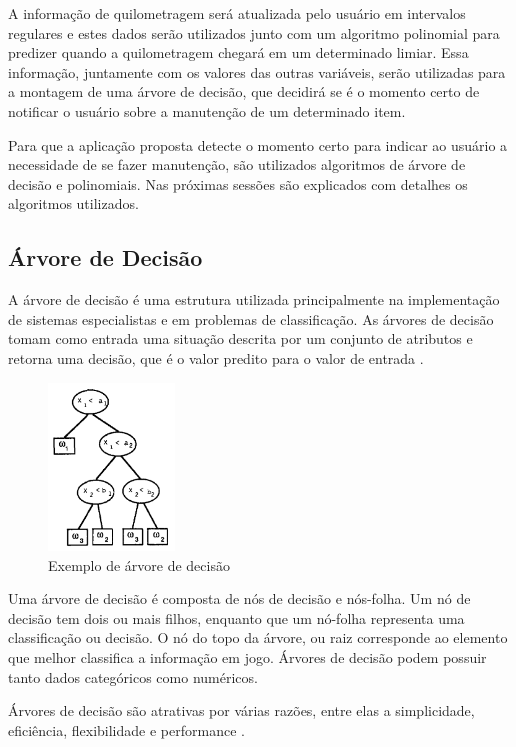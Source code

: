 \documentclass[12pt]{article}
\begin{document}
A informação de quilometragem será atualizada pelo usuário em intervalos
regulares e estes dados serão utilizados junto com um algoritmo polinomial
para predizer quando a quilometragem chegará em um determinado limiar. Essa
informação, juntamente com os valores das outras variáveis, serão utilizadas
para a montagem de uma árvore de decisão, que decidirá se é o momento certo de
notificar o usuário sobre a manutenção de um determinado item.

Para que a aplicação proposta detecte o momento certo para indicar ao usuário a
necessidade de se fazer manutenção, são utilizados algoritmos de árvore de
decisão e polinomiais. Nas próximas sessões são explicados com detalhes os
algoritmos utilizados.

\subsection{Árvore de Decisão}\label{sec:arvorededecisao}
A árvore de decisão é uma estrutura utilizada principalmente na implementação de
sistemas especialistas e em problemas de classificação. As árvores de decisão
tomam como entrada uma situação descrita por um conjunto de atributos e retorna
uma decisão, que é o valor predito para o valor de entrada \cite{russell2003}.

\begin{figure}[h]
\centering
\includegraphics[width=0.3\textwidth]{arvorededecisao}
\caption{Exemplo de árvore de decisão \cite{safavian1991survey}}
\label{arvorededecisao}
\end{figure}

Uma árvore de decisão é composta de nós de decisão e nós-folha. Um nó de decisão
tem dois ou mais filhos, enquanto que um nó-folha representa uma classificação
ou decisão. O nó do topo da árvore, ou raiz corresponde ao elemento que melhor
classifica a informação em jogo. Árvores de decisão podem possuir tanto dados
categóricos como numéricos.

Árvores de decisão são atrativas por várias razões, entre elas a simplicidade,
eficiência, flexibilidade e performance \cite{safavian1991survey}.
\end{document}

